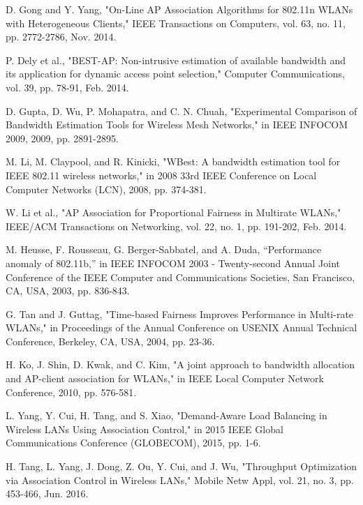 \begin{thebibliography}{1}
 D. Gong and Y. Yang, "On-Line AP Association Algorithms for 802.11n WLANs with Heterogeneous Clients," IEEE Transactions on Computers, vol. 63, no. 11, pp. 2772-2786, Nov. 2014.

 P. Dely et al., "BEST-AP: Non-intrusive estimation of available bandwidth and its application for dynamic access point selection," Computer Communications, vol. 39, pp. 78-91, Feb. 2014.

 D. Gupta, D. Wu, P. Mohapatra, and C. N. Chuah, "Experimental Comparison of Bandwidth Estimation Tools for Wireless Mesh Networks," in IEEE INFOCOM 2009, 2009, pp. 2891-2895.


 M. Li, M. Claypool, and R. Kinicki, "WBest: A bandwidth estimation tool for IEEE 802.11 wireless networks," in 2008 33rd IEEE Conference on Local Computer Networks (LCN), 2008, pp. 374-381.


 W. Li et al., "AP Association for Proportional Fairness in Multirate WLANs," IEEE/ACM Transactions on Networking, vol. 22, no. 1, pp. 191-202, Feb. 2014.

 M. Heusse, F. Rousseau, G. Berger-Sabbatel, and A. Duda, “Performance anomaly of 802.11b,” in IEEE INFOCOM 2003 - Twenty-second Annual Joint Conference of the IEEE Computer and Communications Societies, San Francisco, CA, USA, 2003, pp. 836-843.

 G. Tan and J. Guttag, "Time-based Fairness Improves Performance in Multi-rate WLANs," in Proceedings of the Annual Conference on USENIX Annual Technical Conference, Berkeley, CA, USA, 2004, pp. 23-36.




 H. Ko, J. Shin, D. Kwak, and C. Kim, "A joint approach to bandwidth allocation and AP-client association for WLANs," in IEEE Local Computer Network Conference, 2010, pp. 576-581.

 L. Yang, Y. Cui, H. Tang, and S. Xiao, "Demand-Aware Load Balancing in Wireless LANs Using Association Control," in 2015 IEEE Global Communications Conference (GLOBECOM), 2015, pp. 1-6.

 H. Tang, L. Yang, J. Dong, Z. Ou, Y. Cui, and J. Wu, "Throughput Optimization via Association Control in Wireless LANs," Mobile Netw Appl, vol. 21, no. 3, pp. 453-466, Jun. 2016.


\end{thebibliography}
